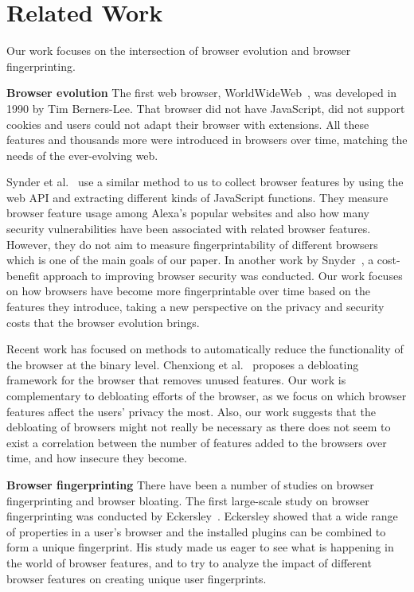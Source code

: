 \section{Related Work}
\label{sec:related-work}

Our work focuses on the intersection of browser evolution and browser
fingerprinting.

\textbf{Browser evolution} The first web browser,
WorldWideWeb~\cite{WorldWideWeb}, was developed in 1990 by Tim
Berners-Lee. That browser did not have JavaScript, did not support
cookies and users could not adapt their browser with extensions. All
these features and thousands more were introduced in browsers over
time, matching the needs of the ever-evolving web.

Synder et al.~\cite{snyder-imc16} use a similar method to us to
collect browser features by using the web API and extracting different
kinds of JavaScript functions. They measure browser feature usage
among Alexa's popular websites and also how many security
vulnerabilities have been associated with related browser
features. However, they do not aim to measure fingerprintability of
different browsers which is one of the main goals of our paper. In
another work by Snyder~\cite{snyder2017most}, a cost-benefit approach
to improving browser security was conducted.  Our work focuses on how
browsers have become more fingerprintable over time based on the
features they introduce, taking a new perspective on the privacy and
security costs that the browser evolution brings.

Recent work has focused on methods to automatically reduce the
functionality of the browser at the binary level. Chenxiong et
al.~\cite{slimium-ccs2020} proposes a debloating framework for the
browser that removes unused features. Our work is complementary to
debloating efforts of the browser, as we focus on which browser
features affect the users' privacy the most. Also, our work suggests that
the debloating of browsers might not really be necessary as there does
not seem to exist a correlation between the number of features added
to the browsers over time, and how insecure they become.

\textbf{Browser fingerprinting} There have been a number of studies on
browser fingerprinting and browser bloating. The first large-scale
study on browser fingerprinting was conducted by
Eckersley~\cite{Eckersley}. Eckersley showed that a wide range of
properties in a user's browser and the installed plugins can be
combined to form a unique fingerprint. His study made us eager to see
what is happening in the world of browser features, and to try to
analyze the impact of different browser features on creating unique
user fingerprints.

